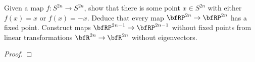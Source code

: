 \begin{problem}[Hatcher {\S}2.2, Ex.\@ 2]
Given a map $f\colon S^{2n}\to S^{2n}$, show that there is some point $x\in
S^{2n}$ with either $f(x)=x$ or $f(x)=-x$. Deduce that every map
$\bfRP^{2n}\to\bfRP^{2n}$ has a fixed point. Construct maps
$\bfRP^{2n-1}\to\bfRP^{2n-1}$ without fixed points from linear
transformations $\bfR^{2n}\to\bfR^{2n}$ without eigenvectors.
\end{problem}
\begin{proof}
\end{proof}


